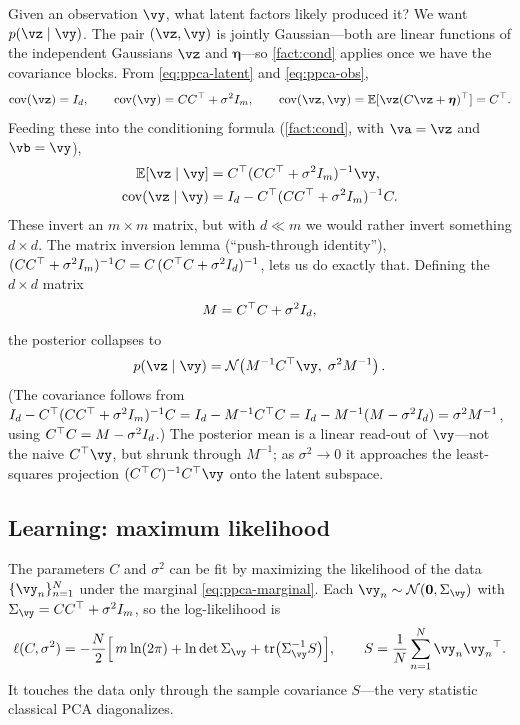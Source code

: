 \documentclass[11pt]{article}
\theoremstyle{plain}
\theoremstyle{definition}
\theoremstyle{remark}
\theoremstyle{definition}
\newcommand{\E}{\mathbb{E}}
\newcommand{\veta}{\bm{\eta}}
\newcommand{\Normal}{\mathcal{N}}
\begin{document}
Given an observation $\vy$, what latent factors likely produced it? We want
$p(\vz \mid \vy)$. The pair $(\vz, \vy)$ is jointly Gaussian---both are linear
functions of the independent Gaussians $\vz$ and $\veta$---so \cref{fact:cond}
applies once we have the covariance blocks. From \eqref{eq:ppca-latent} and
\eqref{eq:ppca-obs},
\begin{equation}
    \cov(\vz) = I_d, \qquad
    \cov(\vy) = C C\trp + \sigma^2 I_m, \qquad
    \cov(\vz, \vy) = \E[\vz(C\vz + \veta)\trp] = C\trp .
\end{equation}
Feeding these into the conditioning formula (\cref{fact:cond}, with $\va = \vz$
and $\vb = \vy$),
\begin{align}
    \E[\vz \mid \vy] &= C\trp(C C\trp + \sigma^2 I_m)^{-1}\vy, \label{eq:ppca-postmean-m}\\
    \cov(\vz \mid \vy) &= I_d - C\trp(C C\trp + \sigma^2 I_m)^{-1} C. \label{eq:ppca-postcov-m}
\end{align}
These invert an $m \times m$ matrix, but with $d \ll m$ we would rather invert
something $d \times d$. The matrix inversion lemma (``push-through identity''),
$(C C{^\top} + \sigma^2 I_m)^{-1} C = C\,(C{^\top} C + \sigma^2 I_d)^{-1}$, lets us do
exactly that. Defining the $d \times d$ matrix
\begin{equation}\label{eq:ppca-M}
    M = C{^\top} C + \sigma^2 I_d,
\end{equation}
the posterior collapses to
\begin{equation}\label{eq:ppca-posterior}
    p(\vz \mid \vy) = \Normal\!\left(M^{-1} C\trp \vy,\; \sigma^2 M^{-1}\right).
\end{equation}
(The covariance follows from
$I_d - C{^\top}(CC{^\top}+\sigma^2 I_m)^{-1}C = I_d - M^{-1} C{^\top} C = I_d - M^{-1}(M - \sigma^2 I_d) = \sigma^2 M^{-1}$,
using $C{^\top} C = M - \sigma^2 I_d$.) The posterior mean is a linear read-out of $\vy$---not the naive
$C\trp\vy$, but shrunk through $M^{-1}$; as $\sigma^2 \to 0$ it approaches the
least-squares projection $(C\trp C)^{-1}C\trp\vy$ onto the latent subspace.

\subsection{Learning: maximum likelihood}

The parameters $C$ and $\sigma^2$ can be fit by maximizing the likelihood of the
data $\{\vy_n\}_{n=1}^N$ under the marginal \eqref{eq:ppca-marginal}. Each
$\vy_n \sim \Normal(\mathbf 0, \Sigma_{\vy})$ with $\Sigma_{\vy} = C C\trp +
\sigma^2 I_m$, so the log-likelihood is
\begin{equation}\label{eq:ppca-loglik}
    \ell(C, \sigma^2)
      = -\frac{N}{2}\Big[\,m \ln(2\pi) + \ln\det\Sigma_{\vy}
        + \tr\!\big(\Sigma_{\vy}^{-1} S\big)\Big],
    \qquad
    S = \frac{1}{N}\sum_{n=1}^N \vy_n \vy_n\trp .
\end{equation}
It touches the data only through the sample covariance $S$---the very statistic
classical PCA diagonalizes.
\end{document}
